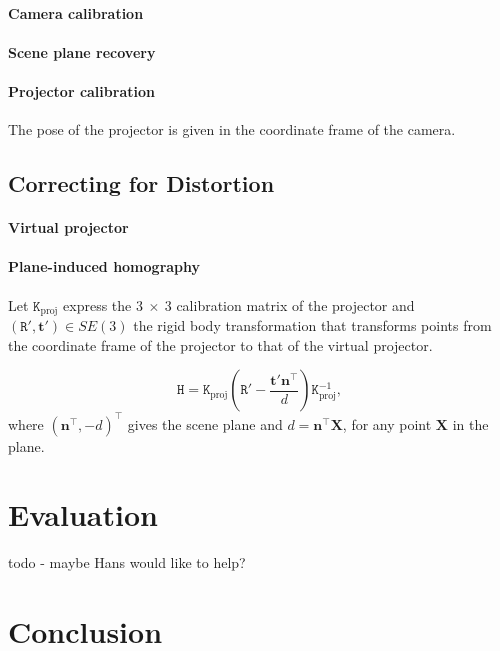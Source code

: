 \documentclass[review]{elsarticle}
\begin{document}
\paragraph{Camera calibration}

\paragraph{Scene plane recovery}

\paragraph{Projector calibration}

The pose of the projector is given in the coordinate frame of the camera.

\subsection{Correcting for Distortion}\label{sec:approach:homography}

\paragraph{Virtual projector}

\paragraph{Plane-induced homography} Let $\mathtt{K}_\text{proj}$ express the $3~\times~3$ calibration matrix of the projector and $(\mathtt{R}', \mathbf{t}') \in SE(3)$ the rigid body transformation that transforms points from the coordinate frame of the projector to that of the virtual projector.

\begin{equation}
\mathtt{H} = \mathtt{K}_\text{proj}\left(\mathtt{R}' - \frac{\mathbf{t}'\mathbf{n}^\top}{d}\right)\mathtt{K}_\text{proj}^{-1},
\label{homgen}
\end{equation}
where $(\mathbf{n}^\top, -d)^\top$ gives the scene plane and $d = \mathbf{n}^\top\mathbf{X}$, for any point $\mathbf{X}$ in the plane. 

\section{Evaluation}

todo - maybe Hans would like to help?

\section{Conclusion}



\end{document}
